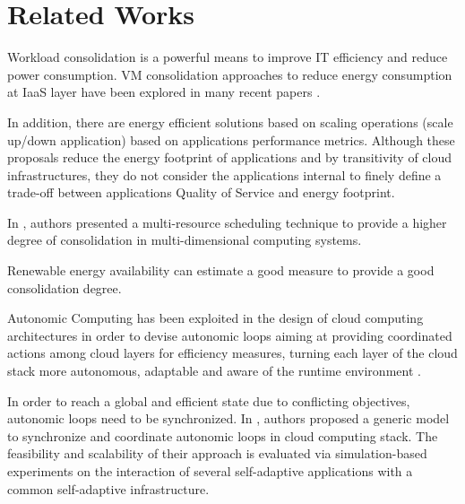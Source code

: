 \section{Related Works}
\label{sec: relworks}

Workload consolidation is a powerful means to improve IT efficiency and reduce power consumption. VM consolidation approaches to reduce energy consumption at IaaS layer have been explored in many recent papers \cite{Cardosa} \cite{ITProf1} \cite{Schroder} \cite{Hermenier2009} \cite{sheikhalishahi_energy_2011} \cite{sheikhalishahi_multi-capacity_2014}.

In addition, there are energy efficient solutions based on scaling operations (scale up/down application) based on applications performance metrics. Although these proposals reduce the energy footprint of applications and by transitivity of cloud infrastructures, they do not consider the applications internal to finely define a trade-off between applications Quality of Service and energy footprint.

In \cite{sheikhalishahi_multi-capacity_2014}, authors presented a multi-resource scheduling technique to provide a higher degree of consolidation in multi-dimensional computing systems.

Renewable energy availability can estimate a good measure to provide a good consolidation degree.

Autonomic Computing has been exploited in the design of cloud computing architectures in order to devise autonomic loops aiming at providing coordinated actions among cloud layers for efficiency measures, turning each layer of the cloud stack more autonomous, adaptable and aware of the runtime environment \cite{alvares_de_oliveira_synchronization_2012} \cite{de_oliveira_self-management_2012}  \cite{de_oliveira_framework_2013}.

In order to reach a global and efficient state due to conflicting objectives, autonomic loops need to be synchronized. In \cite{alvares_de_oliveira_synchronization_2012}, authors proposed a generic model to synchronize and coordinate autonomic loops in cloud computing stack. The feasibility and scalability of their approach is evaluated via simulation-based experiments on the interaction of several self-adaptive applications with a common self-adaptive infrastructure.


